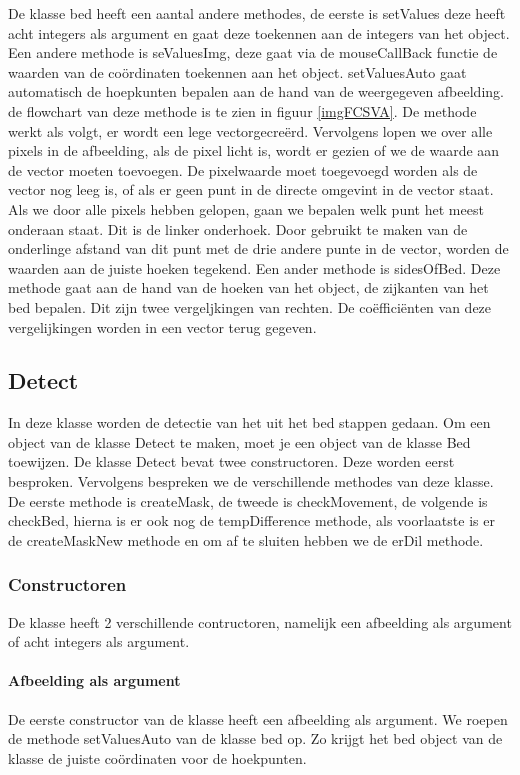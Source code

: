 De klasse bed heeft een aantal andere methodes, de eerste is setValues deze heeft acht integers als argument en gaat deze toekennen aan de integers van het object. Een andere methode is seValuesImg, deze gaat via de mouseCallBack functie de waarden van de co\"ordinaten toekennen aan het object. setValuesAuto gaat automatisch de hoepkunten bepalen aan de hand van de weergegeven afbeelding. de flowchart van deze methode is te zien in figuur \ref{imgFCSVA}. De methode werkt als volgt, er wordt een lege vectorgecre\"erd. Vervolgens lopen we over alle pixels in de afbeelding, als de pixel licht is, wordt er gezien of we de waarde aan de vector moeten toevoegen. De pixelwaarde moet toegevoegd worden als de vector nog leeg is, of als er geen punt in de directe omgevint in de vector staat. Als we door alle pixels hebben gelopen, gaan we bepalen welk punt het meest onderaan staat. Dit is de linker onderhoek. Door gebruikt te maken van de onderlinge afstand van dit punt met de drie andere punte in de vector, worden de waarden aan de juiste hoeken tegekend. Een ander methode is sidesOfBed. Deze methode gaat aan de hand van de hoeken van het object, de zijkanten van het bed bepalen. Dit zijn twee vergeljkingen van rechten. De co\"effici\"enten van deze vergelijkingen worden in een vector terug gegeven. 




\subsection{Detect}
\label{mRefDet}
In deze klasse worden de detectie van het uit het bed stappen gedaan. Om een object van de klasse Detect te maken, moet je een object van de klasse Bed toewijzen. De klasse Detect bevat twee constructoren. Deze worden eerst besproken. Vervolgens bespreken we de verschillende methodes van deze klasse. De eerste methode is createMask, de tweede is checkMovement, de volgende is checkBed, hierna is er ook nog de tempDifference methode, als voorlaatste is er de createMaskNew methode en om af te sluiten hebben we de erDil methode.

\subsubsection{Constructoren}
De klasse heeft 2 verschillende contructoren, namelijk een afbeelding als argument of acht integers als argument.

\paragraph{Afbeelding als argument}
De eerste constructor van de klasse heeft een afbeelding als argument. We  roepen de methode setValuesAuto van de klasse bed op. Zo krijgt het bed object van de klasse de juiste co\"ordinaten voor de hoekpunten. 


